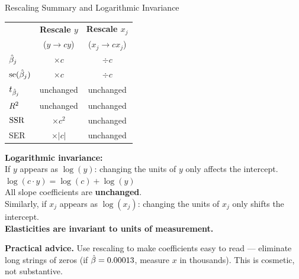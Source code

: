 \documentclass[aspectratio=169, 12pt]{beamer}
\begin{document}
\begin{frame}[shrink=8]{Rescaling Summary and Logarithmic Invariance}

      {\small
      \begin{tabular}{lcc}
        \toprule
        & \textbf{Rescale $y$} & \textbf{Rescale $x_j$} \\
        & ($y \to cy$) & ($x_j \to cx_j$) \\
        \midrule
        $\hat{\beta}_j$    & $\times c$ & $\div c$ \\
        $\operatorname{se}(\hat{\beta}_j)$ & $\times c$ & $\div c$ \\
        $t_{\hat{\beta}_j}$  & unchanged & unchanged \\
        $R^2$       & unchanged & unchanged \\
        $\text{SSR}$       & $\times c^2$ & unchanged \\
        SER          & $\times |c|$ & unchanged \\
        \bottomrule
      \end{tabular}
      }
  \medskip

      \begin{keybox}
        \textbf{Logarithmic invariance:} \\[4pt]
        If $y$ appears as $\log(y)$: changing the units of $y$
        only affects the intercept. \\[4pt]
        $\log(c \cdot y) = \log(c) + \log(y)$ \\[4pt]
        All slope coefficients are \textbf{unchanged}. \\[6pt]
        Similarly, if $x_j$ appears as $\log(x_j)$: changing
        the units of $x_j$ only shifts the intercept. \\[4pt]
        \textbf{Elasticities are invariant to units of measurement.}
      \end{keybox}

  \medskip

  \medskip
  \textbf{Practical advice.} Use rescaling to make coefficients easy to read ---
  eliminate long strings of zeros (if $\hat{\beta} = 0.00013$, measure $x$ in thousands).
  This is cosmetic, not substantive.

\end{frame}
\end{document}
